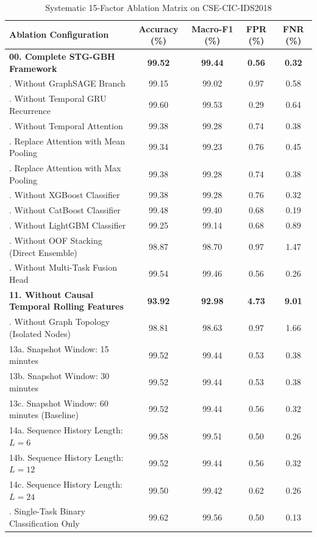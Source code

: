 \documentclass[11pt,a4paper]{article}
\begin{document}
\begin{table}[ht]
\centering
\caption{Systematic 15-Factor Ablation Matrix on CSE-CIC-IDS2018}
\label{tab:ablation}
\small
\begin{tabularx}{\textwidth}{@{} >{\raggedright\arraybackslash}X cccc @{}}
\toprule
\textbf{Ablation Configuration} & \textbf{Accuracy (\%)} & \textbf{Macro-F1 (\%)} & \textbf{FPR (\%)} & \textbf{FNR (\%)} \\
\midrule
\textbf{00. Complete STG-GBH Framework} & \textbf{99.52} & \textbf{99.44} & \textbf{0.56} & \textbf{0.32} \\
01. Without GraphSAGE Branch & 99.15 & 99.02 & 0.97 & 0.58 \\
02. Without Temporal GRU Recurrence & 99.60 & 99.53 & 0.29 & 0.64 \\
03. Without Temporal Attention & 99.38 & 99.28 & 0.74 & 0.38 \\
04. Replace Attention with Mean Pooling & 99.34 & 99.23 & 0.76 & 0.45 \\
05. Replace Attention with Max Pooling & 99.38 & 99.28 & 0.74 & 0.38 \\
06. Without XGBoost Classifier & 99.38 & 99.28 & 0.76 & 0.32 \\
07. Without CatBoost Classifier & 99.48 & 99.40 & 0.68 & 0.19 \\
08. Without LightGBM Classifier & 99.25 & 99.14 & 0.68 & 0.89 \\
09. Without OOF Stacking (Direct Ensemble) & 98.87 & 98.70 & 0.97 & 1.47 \\
10. Without Multi-Task Fusion Head & 99.54 & 99.46 & 0.56 & 0.26 \\
\textbf{11. Without Causal Temporal Rolling Features} & \textbf{93.92} & \textbf{92.98} & \textbf{4.73} & \textbf{9.01} \\
12. Without Graph Topology (Isolated Nodes) & 98.81 & 98.63 & 0.97 & 1.66 \\
13a. Snapshot Window: 15 minutes & 99.52 & 99.44 & 0.53 & 0.38 \\
13b. Snapshot Window: 30 minutes & 99.52 & 99.44 & 0.53 & 0.38 \\
13c. Snapshot Window: 60 minutes (Baseline) & 99.52 & 99.44 & 0.56 & 0.32 \\
14a. Sequence History Length: $L=6$ & 99.58 & 99.51 & 0.50 & 0.26 \\
14b. Sequence History Length: $L=12$ & 99.52 & 99.44 & 0.56 & 0.32 \\
14c. Sequence History Length: $L=24$ & 99.50 & 99.42 & 0.62 & 0.26 \\
15. Single-Task Binary Classification Only & 99.62 & 99.56 & 0.50 & 0.13 \\
\bottomrule
\end{tabularx}
\end{table}
\end{document}
